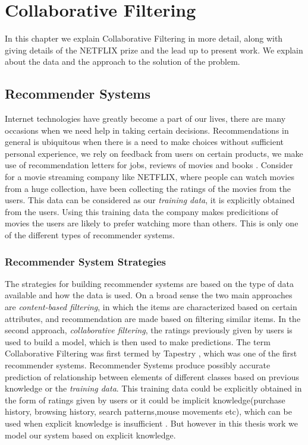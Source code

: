 \chapter{Collaborative Filtering}


\textsf{ In this chapter we explain Collaborative Filtering in more detail,
along with giving details of the NETFLIX prize and the lead up to present work.
We explain about the data and the approach to the solution of the problem.}


\section{Recommender Systems}
Internet technologies have greatly become a part of our lives, there are many
occasions when we need help in taking certain decisions. Recommendations in
general is ubiquitous when there is a need to make choices without sufficient
personal experience, we rely on feedback from users on certain products, we make
use of recommendation letters for jobs, reviews of movies and books
\cite{Resnick:1997:RS:245108.245121}. Consider for a movie streaming company
like NETFLIX, where people can watch movies from a huge collection, have been
collecting the ratings of the movies from the users. This data can be considered
as our \emph{training data}, it is explicitly obtained from the users. Using
this training data the company makes predicitions of movies the users are likely
to prefer watching more than others. This is only one of the different types of
recommender systems. 
\subsection{Recommender System Strategies}
The strategies for building recommender systems are based on the type of data
available and how the data is used. On a broad sense the two main approaches are
\emph{content-based filtering}, in which the items are characterized based on 
certain attributes, and recommendation are made based on filtering similar
items. In the second approach, \emph{collaborative filtering}, the ratings
previously given by users is used to build a model, which is then used to make
predictions. The term Collaborative Filtering was first termed by Tapestry
\cite{Goldberg:1992:UCF:138859.138867}, which was one of the first recommender
systems. Recommender
Systems produce possibly accurate prediction of relationship between elements of
different classes based on previous knowledge or the \emph{training data}. This
training data could be explicitly obtained in the form of ratings given by
users or it could be implicit knowledge(purchase
history, browsing history, search patterns,mouse movements etc), which can be
used when explicit knowledge is insufficient \cite{Hu:2008:CFI:1510528.1511352}.
But however in this thesis work we model our system based on explicit
knowledge. 


